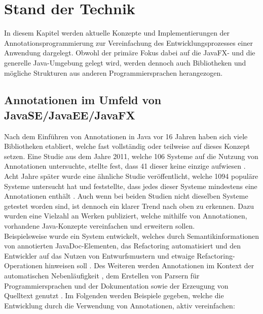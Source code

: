 \chapter{Stand der Technik}
\label{stand_der_technik}
\noindent In diesem Kapitel werden aktuelle Konzepte und Implementierungen der Annotationsprogrammierung zur Vereinfachung des Entwicklungsprozesses einer Anwendung dargelegt. Obwohl der primäre Fokus dabei auf die JavaFX- und die generelle Java-Umgebung gelegt wird, werden dennoch auch Bibliotheken und mögliche Strukturen aus anderen Programmiersprachen herangezogen.

\section{Annotationen im Umfeld von JavaSE/JavaEE/JavaFX}
\label{verwendung_im_umfeld_von_java}
Nach dem Einführen von Annotationen in Java vor 16 Jahren haben sich viele Bibliotheken etabliert, welche fast vollständig oder teilweise auf dieses Konzept setzen. Eine Studie aus dem Jahre 2011, welche 106 Systeme auf die Nutzung von Annotationen untersuchte, stellte fest, dass 41 dieser keine einzige aufwiesen \cite{Rocha2011}. Acht Jahre später wurde eine ähnliche Studie veröffentlicht, welche 1094 populäre Systeme untersucht hat und feststellte, dass jedes dieser Systeme mindestens eine Annotationen enthält \cite{Yu2019}. Auch wenn bei beiden Studien nicht dieselben Systeme getestet worden sind, ist dennoch ein klarer Trend nach oben zu erkennen. Dazu wurden eine Vielzahl an Werken publiziert, welche mithilfe von Annotationen, vorhandene Java-Konzepte vereinfachen und erweitern sollen.\\
Beispielsweise wurde ein System entwickelt, welches durch Semantikinformationen von annotierten JavaDoc-Elementen, das Refactoring automatisiert und den Entwickler auf das Nutzen von Entwurfsmustern und etwaige Refactoring-Operationen hinweisen soll \cite{Meffert2006}. Des Weiteren werden Annotationen im Kontext der automatischen Nebenläufigkeit \cite{Danelutto2007}, dem Erstellen von Parsern für Programmiersprachen \cite{Porubaen2009} und der Dokumentation sowie der Erzeugung von Quelltext genutzt \cite{Sulir2016, Miroslav2009}.
Im Folgenden werden Beispiele gegeben, welche die Entwicklung durch die Verwendung von Annotationen, aktiv vereinfachen:
